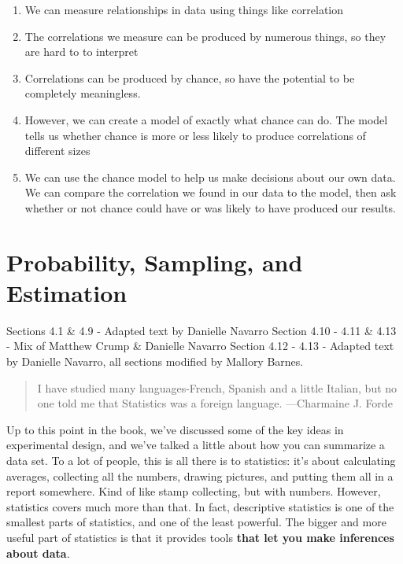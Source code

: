 \documentclass[
  letterpaper,
  DIV=11,
  numbers=noendperiod]{scrreprt}
\providecommand{\tightlist}{%
  \setlength{\itemsep}{0pt}\setlength{\parskip}{0pt}}\usepackage{longtable,booktabs,array}
\begin{document}
\begin{enumerate}
\def\labelenumi{\arabic{enumi}.}
\tightlist
\item
  We can measure relationships in data using things like correlation
\item
  The correlations we measure can be produced by numerous things, so
  they are hard to to interpret
\item
  Correlations can be produced by chance, so have the potential to be
  completely meaningless.
\item
  However, we can create a model of exactly what chance can do. The
  model tells us whether chance is more or less likely to produce
  correlations of different sizes
\item
  We can use the chance model to help us make decisions about our own
  data. We can compare the correlation we found in our data to the
  model, then ask whether or not chance could have or was likely to have
  produced our results.
\end{enumerate}


\chapter{Probability, Sampling, and
Estimation}\label{probability-sampling-and-estimation}

Sections 4.1 \& 4.9 - Adapted text by Danielle Navarro Section 4.10 -
4.11 \& 4.13 - Mix of Matthew Crump \& Danielle Navarro Section 4.12 -
4.13 - Adapted text by Danielle Navarro, all sections modified by
Mallory Barnes.

\hfill\break

\begin{quote}
I have studied many languages-French, Spanish and a little Italian, but
no one told me that Statistics was a foreign language. ---Charmaine J.
Forde
\end{quote}

Up to this point in the book, we've discussed some of the key ideas in
experimental design, and we've talked a little about how you can
summarize a data set. To a lot of people, this is all there is to
statistics: it's about calculating averages, collecting all the numbers,
drawing pictures, and putting them all in a report somewhere. Kind of
like stamp collecting, but with numbers. However, statistics covers much
more than that. In fact, descriptive statistics is one of the smallest
parts of statistics, and one of the least powerful. The bigger and more
useful part of statistics is that it provides tools \textbf{that let you
make inferences about data}.
\end{document}
